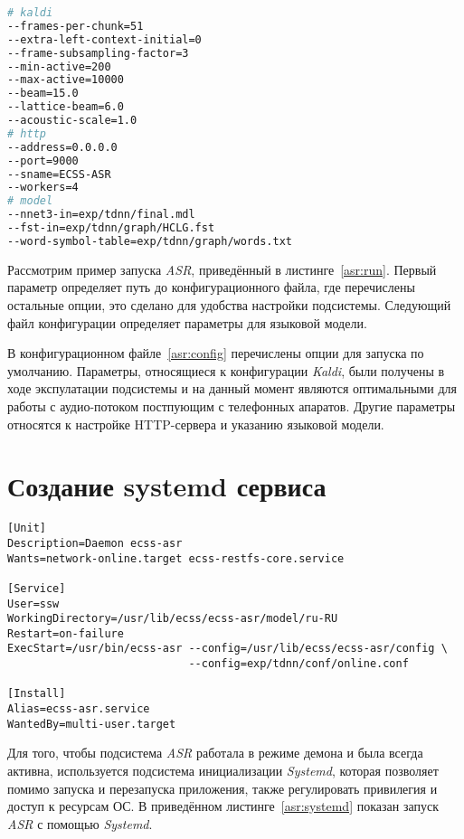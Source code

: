 \begin{lstlisting}[caption={Содежимое config},label={asr:config},language=bash]
# kaldi
--frames-per-chunk=51
--extra-left-context-initial=0
--frame-subsampling-factor=3
--min-active=200
--max-active=10000
--beam=15.0
--lattice-beam=6.0
--acoustic-scale=1.0
# http
--address=0.0.0.0
--port=9000
--sname=ECSS-ASR
--workers=4
# model
--nnet3-in=exp/tdnn/final.mdl
--fst-in=exp/tdnn/graph/HCLG.fst
--word-symbol-table=exp/tdnn/graph/words.txt

\end{lstlisting}


Рассмотрим пример запуска \textit{ASR}, приведённый в листинге~\ref{asr:run}.
Первый параметр определяет путь до конфигурационного файла, где перечислены
остальные опции, это сделано для удобства настройки подсистемы. Следующий
файл конфигурации определяет параметры для языковой модели.

В конфигурационном файле~\ref{asr:config} перечислены опции для запуска по умолчанию.
Параметры, относящиеся к конфигурации \textit{Kaldi}, были получены в ходе
экспулатации подсистемы и на данный момент являются оптимальными для работы с
аудио-потоком постпующим с телефонных апаратов. Другие параметры относятся к
настройке HTTP-сервера и указанию языковой модели.


\section{Создание systemd сервиса}
\begin{lstlisting}[caption={Содежимое ecss-asr.service},label=asr:systemd]
[Unit]
Description=Daemon ecss-asr
Wants=network-online.target ecss-restfs-core.service

[Service]
User=ssw
WorkingDirectory=/usr/lib/ecss/ecss-asr/model/ru-RU
Restart=on-failure
ExecStart=/usr/bin/ecss-asr --config=/usr/lib/ecss/ecss-asr/config \
                            --config=exp/tdnn/conf/online.conf

[Install]
Alias=ecss-asr.service
WantedBy=multi-user.target

\end{lstlisting}

Для того, чтобы подсистема \textit{ASR} работала в режиме демона и была всегда
активна, используется подсистема инициализации \textit{Systemd}, которая
позволяет помимо запуска и перезапуска приложения, также регулировать
привилегия и доступ к ресурсам ОС. В приведённом листинге~\ref{asr:systemd}
показан запуск \textit{ASR} с помощью \textit{Systemd}.

